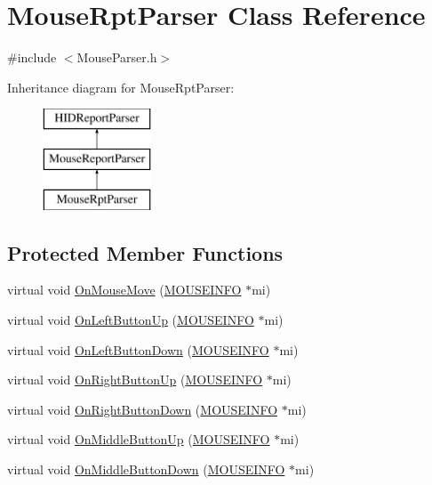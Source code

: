 \hypertarget{class_mouse_rpt_parser}{\section{\-Mouse\-Rpt\-Parser \-Class \-Reference}
\label{class_mouse_rpt_parser}
}


{\ttfamily \#include $<$\-Mouse\-Parser.\-h$>$}

\-Inheritance diagram for \-Mouse\-Rpt\-Parser\-:\begin{figure}[H]
\begin{center}
\leavevmode
\includegraphics[height=3.000000cm]{class_mouse_rpt_parser}
\end{center}
\end{figure}
\subsection*{\-Protected \-Member \-Functions}
\begin{DoxyCompactItemize}
\item 
virtual void \hyperlink{class_mouse_rpt_parser_a09d45536753ef948aa70f63eb59d146c}{\-On\-Mouse\-Move} (\hyperlink{struct_m_o_u_s_e_i_n_f_o}{\-M\-O\-U\-S\-E\-I\-N\-F\-O} $\ast$mi)
\item 
virtual void \hyperlink{class_mouse_rpt_parser_a29f807235e3eb74823a509faa562a4d3}{\-On\-Left\-Button\-Up} (\hyperlink{struct_m_o_u_s_e_i_n_f_o}{\-M\-O\-U\-S\-E\-I\-N\-F\-O} $\ast$mi)
\item 
virtual void \hyperlink{class_mouse_rpt_parser_a38515a2eda2cbe803cdd3b1e315a38bd}{\-On\-Left\-Button\-Down} (\hyperlink{struct_m_o_u_s_e_i_n_f_o}{\-M\-O\-U\-S\-E\-I\-N\-F\-O} $\ast$mi)
\item 
virtual void \hyperlink{class_mouse_rpt_parser_a9982013271f58b2b7244f728346f46fc}{\-On\-Right\-Button\-Up} (\hyperlink{struct_m_o_u_s_e_i_n_f_o}{\-M\-O\-U\-S\-E\-I\-N\-F\-O} $\ast$mi)
\item 
virtual void \hyperlink{class_mouse_rpt_parser_aab071cd7eb86cad343e1cebbe0995750}{\-On\-Right\-Button\-Down} (\hyperlink{struct_m_o_u_s_e_i_n_f_o}{\-M\-O\-U\-S\-E\-I\-N\-F\-O} $\ast$mi)
\item 
virtual void \hyperlink{class_mouse_rpt_parser_ad9869cb022a56f1da4da0fa46b2cf949}{\-On\-Middle\-Button\-Up} (\hyperlink{struct_m_o_u_s_e_i_n_f_o}{\-M\-O\-U\-S\-E\-I\-N\-F\-O} $\ast$mi)
\item 
virtual void \hyperlink{class_mouse_rpt_parser_a8e31781837f6dd88aa93f46a9ab071d1}{\-On\-Middle\-Button\-Down} (\hyperlink{struct_m_o_u_s_e_i_n_f_o}{\-M\-O\-U\-S\-E\-I\-N\-F\-O} $\ast$mi)
\end{DoxyCompactItemize}


